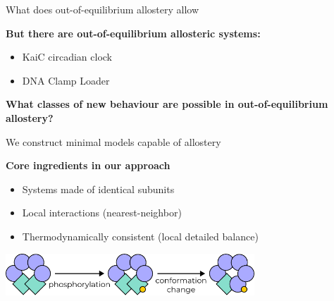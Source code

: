 \documentclass[10pt,mathserif]{beamer}
\newcommand{\extra}[1]{\color{gray} #1 \normalcolor}
\begin{document}
\begin{frame}[fragile]{What does out-of-equilibrium allostery allow}
	\newrefsection

	\vspace{1em}

	\textbf{But there are out-of-equilibrium allosteric systems:}
	\vspace{-.7em}
	\begin{itemize}
		\setlength\itemsep{0em}
		\item KaiC circadian clock\cite{vanzonAllostericModelCircadian2007}
		\item DNA Clamp Loader\cite{kelchHowDNAPolymerase2011}
	\end{itemize}

	\vspace{1.5em}

	\begin{center}
		\bf
		\large
		What classes of new behaviour are possible in out-of-equilibrium allostery?
	\end{center}

	\vspace{1em}

	\vfill
	\printbibliography[heading=none]
	\vspace{-\fill}
\end{frame}

\begin{frame}[fragile]{We construct minimal models capable of allostery}
	\newrefsection

    \vspace{3em}
	\textbf{Core ingredients in our approach}
	\vspace{-0.5em}
	\begin{itemize}
		\item Systems made of identical subunits %
		\item Local interactions \extra{(nearest-neighbor)}
		\item Thermodynamically consistent \extra{(local detailed balance)}
	\end{itemize}
    \vspace{2em}
    \begin{center}
		\includegraphics[width=0.7\textwidth]{figures/our_approach_diagram.pdf}
    \end{center}
\end{frame}
\end{document}
